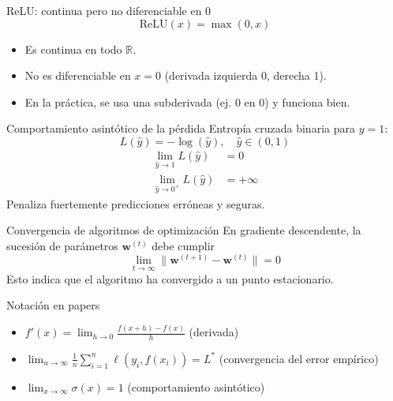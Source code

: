 \documentclass[aspectratio=169, 10pt, xcolor=table]{beamer}
\begin{document}
\begin{frame}{ReLU: continua pero no diferenciable en 0}
    \[
    \text{ReLU}(x) = \max(0,x)
    \]
    \begin{itemize}
        \item Es continua en todo $\mathbb{R}$.
        \item No es diferenciable en $x=0$ (derivada izquierda 0, derecha 1).
        \item En la práctica, se usa una subderivada (ej. 0 en 0) y funciona bien.
    \end{itemize}
\end{frame}

\begin{frame}{Comportamiento asintótico de la pérdida}
    Entropía cruzada binaria para $y=1$:
    \[
    L(\hat{y}) = -\log(\hat{y}), \quad \hat{y}\in(0,1)
    \]
    \begin{align*}
        \lim_{\hat{y}\to 1} L(\hat{y}) &= 0 \\
        \lim_{\hat{y}\to 0^+} L(\hat{y}) &= +\infty
    \end{align*}
    Penaliza fuertemente predicciones erróneas y seguras.
\end{frame}

\begin{frame}{Convergencia de algoritmos de optimización}
    En gradiente descendente, la sucesión de parámetros $\mathbf{w}^{(t)}$ debe cumplir
    \[
    \lim_{t\to\infty} \|\mathbf{w}^{(t+1)} - \mathbf{w}^{(t)}\| = 0
    \]
    Esto indica que el algoritmo ha convergido a un punto estacionario.
\end{frame}

\begin{frame}{Notación en papers}
    \begin{itemize}
        \item $\displaystyle f'(x) = \lim_{h\to 0} \frac{f(x+h)-f(x)}{h}$ (derivada)
        \item $\displaystyle \lim_{n\to\infty} \frac{1}{n}\sum_{i=1}^n \ell(y_i, f(x_i)) = L^*$ (convergencia del error empírico)
        \item $\displaystyle \lim_{x\to\infty} \sigma(x) = 1$ (comportamiento asintótico)
    \end{itemize}
\end{frame}

\end{document}
